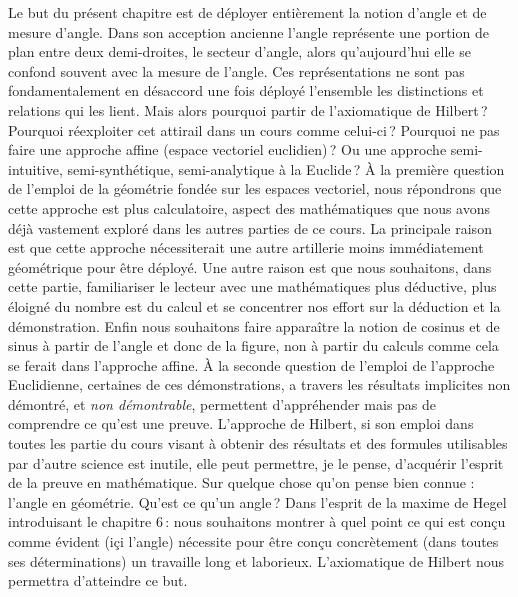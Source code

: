 Le but du présent chapitre est de déployer entièrement la notion d'angle et de mesure d'angle. Dans son acception ancienne l'angle représente une portion de plan entre deux demi-droites, le secteur d'angle, alors qu'aujourd'hui elle se confond souvent avec la mesure de l'angle. Ces représentations ne sont pas fondamentalement en désaccord une fois déployé l'ensemble les distinctions et relations qui les lient. Mais alors pourquoi partir de l'axiomatique de Hilbert\,? Pourquoi réexploiter cet attirail dans un cours comme celui-ci\,? Pourquoi ne pas faire une approche affine (espace vectoriel euclidien)\,? Ou une approche semi-intuitive, semi-synthétique, semi-analytique à la Euclide\,?  À la première question de l'emploi de la géométrie fondée sur les espaces vectoriel, nous répondrons que cette approche est plus calculatoire, aspect des mathématiques que nous avons déjà vastement exploré dans les autres parties de ce cours. La principale raison est que cette approche nécessiterait une autre artillerie moins immédiatement géométrique pour être déployé. Une autre raison est que nous souhaitons, dans cette partie, familiariser le lecteur avec une mathématiques plus déductive, plus éloigné du nombre est du calcul et se concentrer nos effort sur la déduction et la démonstration. Enfin nous souhaitons faire apparaître la notion de cosinus et de sinus à partir de l'angle et donc de la figure, non à partir du calculs comme cela se ferait dans l'approche affine. À la seconde question de l'emploi de l'approche Euclidienne, certaines de ces démonstrations, a travers les résultats implicites non démontré, et \emph{non démontrable}, permettent d'appréhender mais pas de comprendre ce qu'est une preuve. L'approche de Hilbert, si son emploi dans toutes les partie du cours visant à obtenir des résultats et des formules utilisables par d'autre science est inutile, elle peut permettre, je le pense, d'acquérir l'esprit de la preuve en mathématique. Sur quelque chose qu'on pense bien connue : l'angle en géométrie. Qu'est ce qu'un angle\,? Dans l'esprit de la maxime de Hegel introduisant le chapitre 6\,: nous souhaitons montrer à quel point ce qui est conçu comme évident (içi l'angle) nécessite pour être conçu concrètement (\cad dans toutes ses déterminations) un travaille long et laborieux. L'axiomatique de Hilbert nous permettra d'atteindre ce but. 



